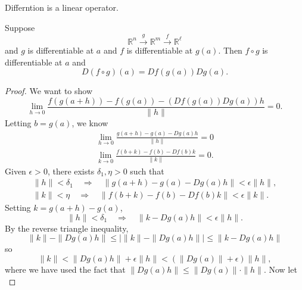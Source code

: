 \documentclass[12pt]{article}
\begin{document}
\begin{corollary}
	Differntion is a linear operator.
\end{corollary}

\begin{theorem}
	Suppose 
	\begin{equation*}
		\mathbb{R}^n \overset{g}{\to} \mathbb{R}^m \overset{f}{\longrightarrow} \mathbb{R}^\ell
	\end{equation*}
	and $g$ is differentiable at $a$ and $f$ is differentiable at $g(a)$. Then $f\circ g$ is differentiable at $a$ and 
	\begin{equation*}
		D(f\circ g)(a) = Df(g(a))Dg(a).
	\end{equation*}
\end{theorem}
\begin{proof}
	We want to show 
	\begin{equation*}
	\label{pf_chain_rule_to_show}
		\lim_{h\to 0}\frac{f(g(a+h))-f(g(a))-(Df(g(a))Dg(a))h}{\|h\|} = 0.\tag{$\ast$}
	\end{equation*}
	Letting $b=g(a)$, we know 
	\begin{gather*}
		\lim_{h\to 0}\frac{g(a+h)-g(a)-Dg(a)h}{\|h\|} = 0 \\
		\lim_{k\to 0}\frac{f(b+k)-f(b)-Df(b)k}{\|k\|} = 0.
	\end{gather*}
	Given $\epsilon>0$, there exists $\delta_1,\eta>0$ such that 
	\begin{gather*}
	\label{pf_chain_rule_hk_ineq}
		\|h\|<\delta_1 \quad \Rightarrow \quad \|g(a+h)-g(a)-Dg(a)h\|<\epsilon\|h\|,\tag{$\ast\ast$} \\
		\|k\|<\eta \quad \Rightarrow \quad \|f(b+k)-f(b)-Df(b)k\| < \epsilon\|k\|.
	\end{gather*}
	Setting $k=g(a+h)-g(a)$,
	\begin{equation*}
		\|h\|<\delta_1 \quad \Rightarrow \quad \|k-Dg(a)h\|<\epsilon\|h\|.
	\end{equation*}
	By the reverse triangle inequality,
	\begin{equation*}
		\|k\|-\|Dg(a)h\| \leq \big| \|k\|-\|Dg(a)h\| \big| \leq \|k-Dg(a)h\|
	\end{equation*}
	so 
	\begin{equation*}
	\label{pf_chain_rule_k_ineq}
		\|k\| < \|Dg(a)h\| + \epsilon\|h\| < (\|Dg(a)\| + \epsilon)\|h\|,\tag{$\ast\ast\ast$}
	\end{equation*}
	where we have used the fact that $\|Dg(a)h\|\leq \|Dg(a)\|\cdot \|h\|$. Now let 
	\begin{equation*}

\end{equation*}
\end{proof}
\end{document}
